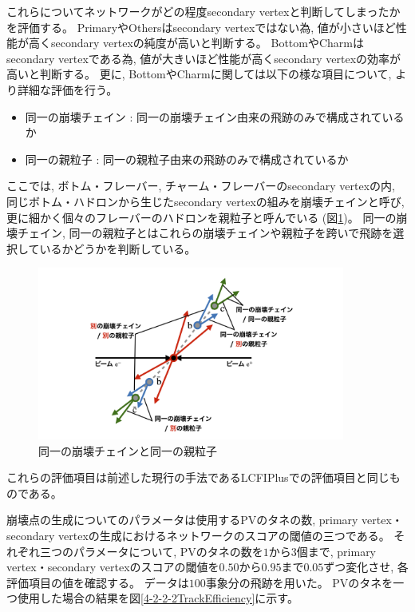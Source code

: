 これらについてネットワークがどの程度secondary vertexと判断してしまったかを評価する。
PrimaryやOthersはsecondary vertexではない為, 値が小さいほど性能が高くsecondary vertexの純度が高いと判断する。
BottomやCharmはsecondary vertexである為, 値が大きいほど性能が高くsecondary vertexの効率が高いと判断する。
更に, BottomやCharmに関しては以下の様な項目について, より詳細な評価を行う。

\begin{itemize}
 \item 同一の崩壊チェイン : 同一の崩壊チェイン由来の飛跡のみで構成されているか
 \item 同一の親粒子 : 同一の親粒子由来の飛跡のみで構成されているか
\end{itemize}

ここでは, ボトム・フレーバー, チャーム・フレーバーのsecondary vertexの内, 同じボトム・ハドロンから生じたsecondary vertexの組みを崩壊チェインと呼び, 更に細かく個々のフレーバーのハドロンを親粒子と呼んでいる (図\ref{4-2-2-1SameChainSameParticle})。
同一の崩壊チェイン, 同一の親粒子とはこれらの崩壊チェインや親粒子を跨いで飛跡を選択しているかどうかを判断している。

\begin{figure}[htbp]
 \centering
 \includegraphics[width=0.9\textwidth, clip]{Figure/4VertexFinderwithDL/4-2-2-1SameChainSameParticle.png}
 \caption[同一の崩壊チェインと同一の親粒子]{同一の崩壊チェインと同一の親粒子}
 \label{4-2-2-1SameChainSameParticle}
\end{figure}

これらの評価項目は前述した現行の手法であるLCFIPlusでの評価項目と同じものである。

崩壊点の生成についてのパラメータは使用するPVのタネの数, primary vertex・secondary vertexの生成におけるネットワークのスコアの閾値の三つである。
それぞれ三つのパラメータについて, PVのタネの数を$1$から$3$個まで, primary vertex・secondary vertexのスコアの閾値を$0.50$から$0.95$まで$0.05$ずつ変化させ, 各評価項目の値を確認する。
データは$100$事象分の飛跡を用いた。
PVのタネを一つ使用した場合の結果を図\ref{4-2-2-2TrackEfficiency}に示す。

